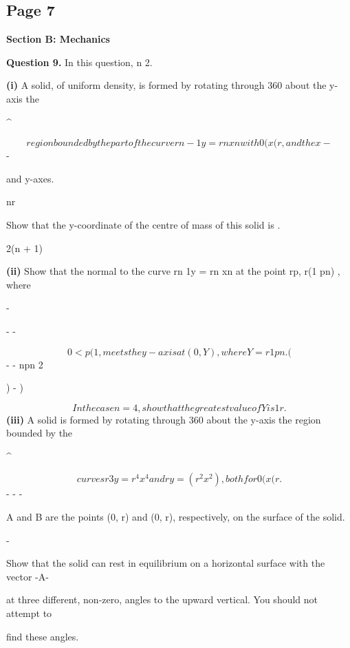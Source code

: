 \documentclass[12pt]{article}
\begin{document}
\subsection*{Page 7}
\begin{flushleft}
\bigskip\textbf{Section B: Mechanics}\par
\bigskip\textbf{Question 9.} In this question, n  2.\par
\textbf{(i)} A solid, of uniform density, is formed by rotating through 360 about the y-axis the\par
\textasciicircum{}\circ\par
\[region bounded by the part of the curve rn - 1y = rn xn with 0 ( x ( r, and the x-\]
-\par
and y-axes.\par
nr\par
Show that the y-coordinate of the centre of mass of this solid is .\par
2(n + 1)\par
\textbf{(ii)} Show that the normal to the curve rn 1y = rn xn at the point rp, r(1 pn) , where\par
-\par
- -\par
\[0 < p ( 1, meets the y-axis at (0, Y ), where Y = r 1 pn  . (\]
- - npn 2\par
) - )\par
\[In the case n = 4, show that the greatest value of Y is 1 r.\]
\textbf{(iii)} A solid is formed by rotating through 360 about the y-axis the region bounded by the\par
\textasciicircum{}\circ\par
\[curves r3y = r^4 x^4 and ry = (r^2 x^2), both for 0 ( x ( r.\]
- - -\par
A and B are the points (0, r) and (0, r), respectively, on the surface of the solid.\par
-\par
Show that the solid can rest in equilibrium on a horizontal surface with the vector -A-\toB\par
at three different, non-zero, angles to the upward vertical. You should not attempt to\par
find these angles.\par
\end{flushleft}
\end{document}
